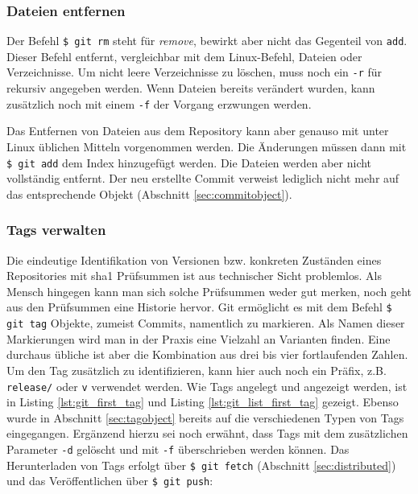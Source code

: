 
\subsubsection{Dateien entfernen}
Der Befehl \texttt{\$ git rm} steht für \textit{remove}, bewirkt aber nicht das
Gegenteil von \texttt{add}. Dieser Befehl entfernt, vergleichbar mit dem
Linux-Befehl, Dateien oder Verzeichnisse. Um nicht leere Verzeichnisse zu
löschen, muss noch ein \texttt{-r} für rekursiv angegeben werden. Wenn Dateien
bereits verändert wurden, kann zusätzlich noch mit einem \texttt{-f} der
Vorgang erzwungen werden.


Das Entfernen von Dateien aus dem Repository kann aber genauso mit unter Linux
üblichen Mitteln vorgenommen werden. Die Änderungen müssen dann mit \texttt{\$
git add} dem Index hinzugefügt werden. Die Dateien werden aber nicht
vollständig entfernt. Der neu erstellte Commit verweist lediglich nicht mehr
auf das entsprechende Objekt (Abschnitt \ref{sec:commitobject}).
\cite[S.~43-44]{gitosp}

\subsubsection{Tags verwalten}\label{sec:managetags}
Die eindeutige Identifikation von Versionen bzw. konkreten Zuständen eines
Repositories mit \gls{sha1} Prüfsummen ist aus technischer Sicht problemlos.
Als Mensch hingegen kann man sich solche Prüfsummen weder gut merken, noch geht
aus den Prüfsummen eine Historie hervor. Git ermöglicht es mit dem Befehl
\texttt{\$ git tag} Objekte, zumeist Commits, namentlich zu markieren. Als
Namen dieser Markierungen wird man in der Praxis eine Vielzahl an Varianten
finden. Eine durchaus übliche ist aber die Kombination aus drei bis vier
fortlaufenden Zahlen. Um den Tag zusätzlich zu identifizieren, kann hier auch
noch ein Präfix, z.B. \texttt{release/} oder \texttt{v} verwendet werden. Wie
Tags angelegt und angezeigt werden, ist in Listing \ref{lst:git_first_tag} und
Listing \ref{lst:git_list_first_tag} gezeigt.  Ebenso wurde in Abschnitt
\ref{sec:tagobject} bereits auf die verschiedenen Typen von Tags eingegangen.
Ergänzend hierzu sei noch erwähnt, dass Tags mit dem zusätzlichen Parameter
\texttt{-d} gelöscht und mit \texttt{-f} überschrieben werden können. Das
Herunterladen von Tags erfolgt über \texttt{\$ git fetch} (Abschnitt
\ref{sec:distributed}) und das Veröffentlichen über \texttt{\$ git push}:

